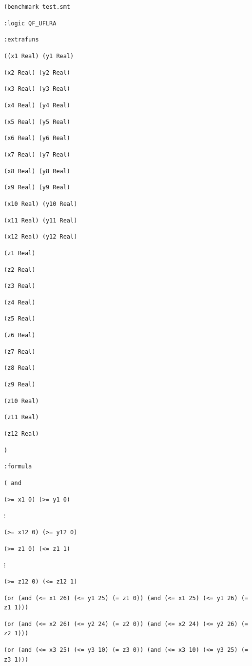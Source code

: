 \documentclass[12pt]{article}
\begin{document}
{\footnotesize
{\tt (benchmark test.smt }

{\tt :logic QF\_UFLRA }

{\tt :extrafuns }

{\tt ((x1 Real) (y1 Real) }

{\tt (x2 Real) (y2 Real) }

{\tt (x3 Real) (y3 Real) }

{\tt (x4 Real) (y4 Real) }

{\tt (x5 Real) (y5 Real) }

{\tt (x6 Real) (y6 Real) }

{\tt (x7 Real) (y7 Real) }

{\tt (x8 Real) (y8 Real) }

{\tt (x9 Real) (y9 Real) }

{\tt (x10 Real) (y10 Real) }

{\tt (x11 Real) (y11 Real) }

{\tt (x12 Real) (y12 Real) }

{\tt (z1 Real) }

{\tt (z2 Real) }

{\tt (z3 Real) }

{\tt (z4 Real) }

{\tt (z5 Real) }

{\tt (z6 Real) }

{\tt (z7 Real) }

{\tt (z8 Real) }

{\tt (z9 Real) }

{\tt (z10 Real) }

{\tt (z11 Real) }

{\tt (z12 Real) }

{\tt ) }

{\tt :formula }

{\tt ( and  }

{\tt (>= x1 0) (>= y1 0)  }

$\vdots$

{\tt (>= x12 0) (>= y12 0) }

{\tt (>= z1 0) (<= z1 1) } 

$\vdots$

{\tt (>= z12 0) (<= z12 1) }

{\tt (or (and (<= x1 26) (<= y1 25) (= z1 0)) (and (<= x1 25) (<= y1 26) (= z1 1))) }

{\tt (or (and (<= x2 26) (<= y2 24) (= z2 0)) (and (<= x2 24) (<= y2 26) (= z2 1))) }

{\tt (or (and (<= x3 25) (<= y3 10) (= z3 0)) (and (<= x3 10) (<= y3 25) (= z3 1))) }

}
\end{document}
